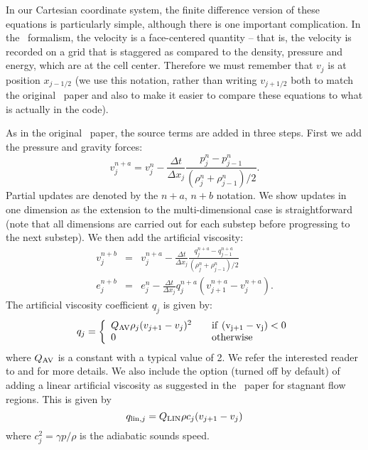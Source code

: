 In our Cartesian coordinate system, the finite difference version of
these equations is particularly simple, although there is one
important complication.  In the \zeus\ formalism, the velocity is a
face-centered quantity -- that is, the velocity is recorded on a grid
that is staggered as compared to the density, pressure and energy,
which are at the cell center.  Therefore we must remember that $v_j$
is at position $x_{j-1/2}$ (we use this notation, rather than writing
$v_{j+1/2}$ both to match the original \zeus\ paper and also to make
it easier to compare these equations to what is actually in the code).  

As in the original \zeus\ paper, the source terms are added in three
steps. First we add the pressure and gravity forces:
\begin{equation}
v_j^{n+a}  =  v_j^n - \frac{\Delta t}{\Delta x_j} \frac{p^n_j - p^n_{j-1}} {(\rho^n_j + \rho^n_{j-1})/2}.
\end{equation}
Partial updates are denoted by the $n+a$, $n+b$ notation.  We show
updates in one dimension as the extension to the multi-dimensional
case is straightforward (note that all dimensions are carried out for
each substep before progressing to the next substep). We then add the
artificial viscosity:
\begin{eqnarray}
v_j^{n+b} & = & v_j^{n+a} - \frac{\Delta t}{\Delta x_j} 
                             \frac{q^{n+a}_j - q^{n+a}_{j-1}} {(\rho^n_j + \rho^n_{j-1})/2} \\
e_j^{n+b} & = & e_j^n - \frac{\Delta t}{\Delta x_j} q^{n+a}_j (v^{n+a}_{j+1} - v^{n+a}_{j}).
\end{eqnarray}
The artificial viscosity coefficient $q_j$ is given by:
\begin{equation}
q_j = \left\{ \begin{array}{ll}
              Q_{\rm AV} \rho_j (v_{j+1} - v_j)^2 \quad & \rm{if}~(v_{j+1} - v_j) < 0 \\
               0 & \rm{otherwise}
               \end{array} \right.
\end{equation}
where $Q_{\rm AV}$ is a constant with a typical value of 2. We refer
the interested reader to \citet{Stone92a} and
\citet{1994ApJ...429..434A} for more details.  We also include the
option (turned off by default) of adding a linear artificial viscosity
as suggested in the \zeus\ paper for stagnant flow regions.  This is
given by
\begin{equation}
q_{{\rm lin},j} = Q_{\rm LIN} \rho c_j (v_{j+1} - v_{j})
\end{equation}
where $c_j^2 = \gamma p/\rho$ is the adiabatic sounds speed.

